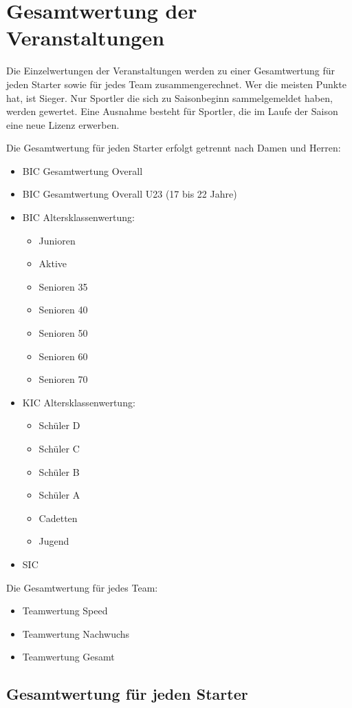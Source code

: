 \section{Gesamtwertung der Veranstaltungen}
Die Einzelwertungen der Veranstaltungen werden zu einer Gesamtwertung für jeden Starter sowie für jedes Team zusammengerechnet. Wer die meisten Punkte hat, ist Sieger. Nur Sportler die sich zu Saisonbeginn sammelgemeldet haben, werden gewertet. Eine Ausnahme besteht für Sportler, die im Laufe der Saison eine neue Lizenz erwerben.

Die Gesamtwertung für jeden Starter erfolgt getrennt nach Damen und Herren:
\begin{itemize}
	\item BIC Gesamtwertung Overall
	\item BIC Gesamtwertung Overall U23 (17 bis 22 Jahre)
	\item BIC Altersklassenwertung:
	\begin{itemize}
		\item Junioren
		\item Aktive
		\item Senioren 35
		\item Senioren 40
		\item Senioren 50
		\item Senioren 60
		\item Senioren 70
	\end{itemize}
	\item KIC Altersklassenwertung:
	\begin{itemize}
		\item Schüler D
		\item Schüler C
		\item Schüler B
		\item Schüler A
		\item Cadetten
		\item Jugend
	\end{itemize}
	\item SIC
\end{itemize}

Die Gesamtwertung für jedes Team:
\begin{itemize}
	\item Teamwertung Speed
	\item Teamwertung Nachwuchs
	\item Teamwertung Gesamt
\end{itemize}

\subsection{Gesamtwertung für jeden Starter}

